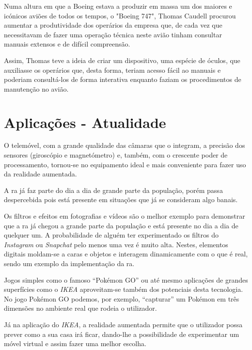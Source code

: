 \documentclass{report}
\begin{document}
Numa altura em que a Boeing estava a produzir em massa um dos maiores e icónicos aviões de todos os tempos, o "Boeing 747", Thomas Caudell procurou aumentar a produtividade dos operários da empresa que, de cada vez que necessitavam de fazer uma operação técnica neste avião tinham consultar manuais extensos e de difícil compreensão.

Assim, Thomas teve a ideia de criar um dispositivo, uma espécie de óculos, que auxiliasse os operários que, desta forma, teriam acesso fácil ao manuais e poderiam consultá-los de forma interativa enquanto faziam os procedimentos de manutenção no avião.

\section{Aplicações - Atualidade}
O telemóvel, com a grande qualidade das câmaras que o integram, a precisão dos sensores (giroscópio e magnetómetro) e, também, com o crescente poder de processamento, tornou-se no equipamento ideal e mais conveniente para fazer uso da realidade aumentada.

A \ac{ra} já faz parte do dia a dia de grande parte da população, porém passa despercebida pois está presente em situações que já se consideram algo banais.

Os filtros e efeitos em fotografias e vídeos são o melhor exemplo para demonstrar que a \ac{ra} já chegou a grande parte da população e está presente no dia a dia de quelquer um. A probabilidade de alguém ter experimentado os filtros do \textit{Instagram} ou \textit{Snapchat} pelo menos uma vez é muito alta. Nestes, elementos digitais moldam-se a caras e objetos e interagem dinamicamente com o que é real, sendo um exemplo da implementação da \ac{ra}.

Jogos simples como o famoso “Pokémon GO” ou até mesmo aplicações de grandes superfícies como o \textit{IKEA} aproveitam-se também dos potenciais desta tecnologia. No jogo Pokémon GO podemos, por exemplo, “capturar” um Pokémon em três dimensões no ambiente real que rodeia o utilizador.

Já na aplicação do \textit{IKEA}, a realidade aumentada permite que o utilizador possa prever como a sua casa irá ficar, dando-lhe a possibilidade de experimentar um móvel virtual e assim fazer uma melhor escolha.
\end{document}
